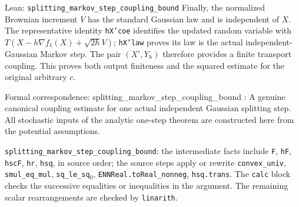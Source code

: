 \documentclass[11pt,a4paper]{article}
\begin{document}
\begin{leanbox}{Lean: \texttt{splitting\_\allowbreak{}markov\_\allowbreak{}step\_\allowbreak{}coupling\_\allowbreak{}bound}}
Finally, the normalized Brownian increment \(V\) has the standard Gaussian law and is independent of \(X\). The representative identity \texttt{h\allowbreak{}X'coe} identifies the updated random variable with \(T(X-h\nabla f_1(X)+\sqrt{2h}V)\); \texttt{h\allowbreak{}X'law} proves its law is the actual independent-Gaussian Markov step. The pair \((X',Y_h)\) therefore provides a finite transport coupling. This proves both output finiteness and the squared estimate for the original arbitrary \(c\).



Formal correspondence: splitting\_markov\_step\_coupling\_bound : A genuine canonical coupling estimate for one actual independent Gaussian splitting step. All stochastic inputs of the analytic one-step theorem are constructed here from the potential assumptions.



\texttt{splitting\_\allowbreak{}markov\_\allowbreak{}step\_\allowbreak{}coupling\_\allowbreak{}bound}: the intermediate facts include \texttt{F}, \texttt{h\allowbreak{}F}, \texttt{hsc\allowbreak{}F}, \texttt{hr}, \texttt{hsq}, in source order; the source steps apply or rewrite \texttt{convex\_\allowbreak{}univ}, \texttt{smul\_\allowbreak{}eq\_\allowbreak{}mul}, \texttt{sq\_\allowbreak{}le\_\allowbreak{}sq\ensuremath{{}_{0}}}, \texttt{ENNReal.\allowbreak{}to\allowbreak{}Real\_\allowbreak{}nonneg}, \texttt{hsq.\allowbreak{}trans}. The \texttt{calc} block checks the successive equalities or inequalities in the argument. The remaining scalar rearrangements are checked by \texttt{linarith}.
\end{leanbox}
\end{document}
